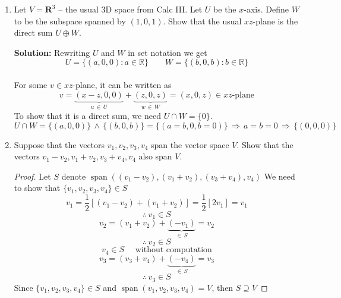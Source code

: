 \documentclass[12pt]{article}
\newcommand{\R}{\mathbb{R}}
\newcommand{\brac}[1]{\left[ {#1} \right] }
\newcommand{\AND}{\,\land\,}
\newcommand{\then}{\,\Rightarrow\,}
\renewcommand{\over}[1]{\frac{1}{{#1}}}
\begin{document}
\begin{enumerate}
\begin{mybox}
\end{mybox}
\vspace{1.5in}
\item  Let $V = \mathbf{R}^3$ -- the usual 3D space from Calc III.  Let $U$ be the $x$-axis.  Define $W$ to be the subspace spanned by $(1,0,1)$.  Show that the usual $xz$-plane is the direct sum $U \oplus W$.
\begin{mybox}
    \textbf{Solution: } Rewriting $U$ and $W$ in set notation we get
    $$U = \{(a,0,0) : a \in \R\} \qquad W = \{(b,0,b) : b \in \R\}$$
    \\For some $v \in xz$-plane, it can be written as
    $$v = \underbrace{(x-z, 0, 0)}_{u\,\in\, U} + \underbrace{(z, 0, z)}_{w \,\in\, W} = (x,0,z) \in xz\text{-plane}$$
    To show that it is a direct sum, we need $U \cap W = \{0\}$. 
    $$U \cap W = \{(a,0,0)\} \AND \{(b,0,b)\} = \{(a=b, 0, b=0)\} \then a=b=0 \then \{(0,0,0)\}$$
\end{mybox}\newpage
\item  Suppose that the vectors $v_1, v_2, v_3, v_4$ span the vector space $V$.  Show that the vectors $v_1-v_2, v_1+v_2, v_3+v_4, v_4$ also span $V$.
\begin{mybox}
    \begin{proof} 
    Let $S$ denote $\operatorname{span}((v_1-v_2), (v_1+v_2), (v_3+v_4), v_4)$ We need to show that $\{v_1, v_2, v_3, v_4\} \in S$
    $$v_1 = \over{2} \brac{(v_1-v_2) + (v_1 + v_2)} = \over{2}\brac{2v_1} = v_1$$
        $$\therefore \, v_1 \in S$$
        \vspace{0.1in}
    $$v_2 = (v_1+v_2) + \underbrace{(-v_1)}_{\in\, S} = v_2$$
                $$\therefore \, v_2 \in S$$\vspace{0.1in}
        $$v_4 \in S \quad \text{ without computation}$$\vspace{0.1in}
        $$v_3 = (v_3 + v_4) + \underbrace{(-v_4)}_{\in\, S} = v_3$$
        $$\therefore\, v_3 \in S$$
        Since $\{v_1, v_2, v_3, v_4\} \in S$ and $\operatorname{span}(v_1, v_2, v_3, v_4) = V$, then $S  \supseteq V$
        \end{proof}
\end{mybox}
\end{enumerate}
\end{document}
